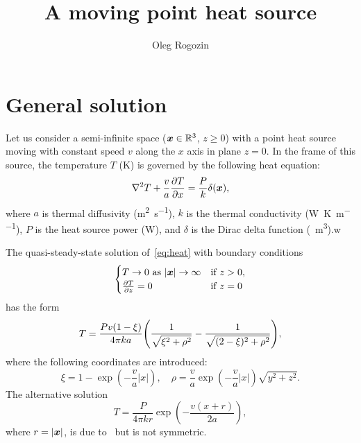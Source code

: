 \documentclass{article}
\title{A moving point heat source}
\author{Oleg Rogozin}
\newcommand{\bx}{\vb*{x}}
\begin{document}
\maketitle

\section{General solution}

Let us consider a semi-infinite space ($\bx\in\mathbb{R}^3$, $z\geq0$) with a point heat source
moving with constant speed $v$ along the $x$ axis in plane $z=0$.
In the frame of this source, the temperature $T$ (\si{K}) is governed by the following heat equation:
\begin{equation}\label{eq:heat}
    \laplacian{T} + \frac{v}{a}\pdv{T}{x} = \frac{P}{k}\delta(\bx),
\end{equation}
where $a$ is thermal diffusivity (\si{\m\squared\per\s}),
$k$ is the thermal conductivity (\si{\W\per\K\per\m}),
$P$ is the heat source power (\si{\W}),
and $\delta$ is the Dirac delta function (\si{\per\m\cubed}).w

The quasi-steady-state solution of~\eqref{eq:heat} with boundary conditions
\begin{equation}\label{eq:bc}
    \begin{cases}
        T\to0 \text{ as } |\bx|\to\infty & \text{if } z>0, \\
        \pdv{T}{z}=0 & \text{if } z=0
    \end{cases}
\end{equation}
has the form~\autocite{levin2008general}
\begin{equation}\label{eq:solution1}
    T = \frac{Pv(1-\xi)}{4\pi ka}\qty( \frac1{\sqrt{\xi^2 +\rho^2}} - \frac1{\sqrt{(2-\xi)^2 +\rho^2}} ),
\end{equation}
where the following coordinates are introduced:
\begin{equation}
    \xi = 1 - \exp(-\frac{v}{a}|x|), \quad
    \rho = \frac{v}{a}\exp(-\frac{v}{a}|x|)\sqrt{y^2 + z^2}.
\end{equation}
The alternative solution
\begin{equation}\label{eq:solution2}
    T = \frac{P}{4\pi kr}\exp(-\frac{v(x+r)}{2a}),
\end{equation}
where $r = |\bx|$, is due to~\textcite{rosenthal1946theory} but is not symmetric.
\end{document}
